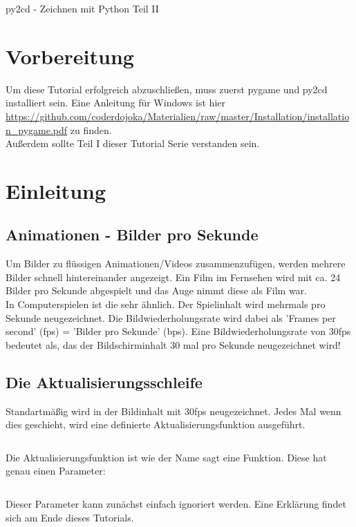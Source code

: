 \documentclass{\VorlagenPfad/coderdojokatext}
\newcommand{\Titel}{py2cd - Zeichnen mit Python Teil II}
\begin{document}
\begin{center}
	{\huge \Titel}
\end{center}

\section{Vorbereitung}
Um diese Tutorial erfolgreich abzuschließen, muss zuerst pygame und py2cd installiert sein. Eine Anleitung für Windows ist hier \url{https://github.com/coderdojoka/Materialien/raw/master/Installation/installation_pygame.pdf} zu finden.
\\
Außerdem sollte Teil I dieser Tutorial Serie verstanden sein.
\section{Einleitung}

\subsection{Animationen - Bilder pro Sekunde}
Um Bilder zu flüssigen Animationen/Videos zusammenzufügen, werden mehrere Bilder schnell hintereinander angezeigt. Ein Film im Fernsehen wird mit ca. 24 Bilder pro Sekunde abgespielt und das Auge nimmt diese als Film war.
\\In Computerspielen ist die sehr ähnlich. Der Spielinhalt wird mehrmals pro Sekunde neugezeichnet. Die Bildwiederholungsrate wird dabei als 'Frames per second' (fps) = 'Bilder pro Sekunde' (bps). Eine Bildwiederholungsrate von 30fps bedeutet als, das der Bildschirminhalt 30 mal pro Sekunde neugezeichnet wird!

\subsection{Die Aktualisierungsschleife}
Standartmäßig wird in  der Bildinhalt mit 30fps neugezeichnet. Jedes Mal wenn dies geschieht, wird eine definierte Aktualisierungsfunktion ausgeführt.

\inputminted[firstline=3]{python}{../../../Beispiele/py2cd/aktualisierungs_funktion.py}

\begin{merkbox}
Die Aktualisierungsfunktion ist wie der Name sagt eine Funktion. Diese hat genau einen Parameter:

\inputminted[firstline=7, lastline=10]{python}{../../../Beispiele/py2cd/aktualisierungs_funktion.py}
\label{erklaerung}Dieser Parameter kann zunächst einfach ignoriert werden. Eine Erklärung findet sich am Ende dieses Tutorials.

\end{merkbox}
\end{document}
